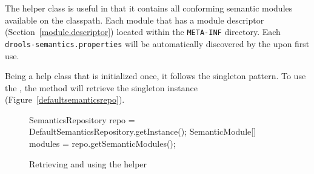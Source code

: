 The  helper class is useful
in that it contains all conforming semantic modules available on
the classpath.  Each module that has a module descriptor
(Section~\vref{module.descriptor}) located within the 
\texttt{META-INF} directory.  Each \texttt{drools-semantics.properties}
will be automatically discovered by the
upon first use.  

Being a help class that is initialized once, it follows the
singleton pattern.  To use the
, the
method will retrieve the singleton instance
(Figure~\vref{defaultsemanticsrepo}).

\begin{figure}
\begin{javaCodelisting}
SemanticsRepository repo    = DefaultSemanticsRepository.getInstance();
SemanticModule[]    modules = repo.getSemanticModules();
\end{javaCodelisting}
\caption{Retrieving and using the
 helper}
\label{defaultsemanticsrepo}
\end{figure}

